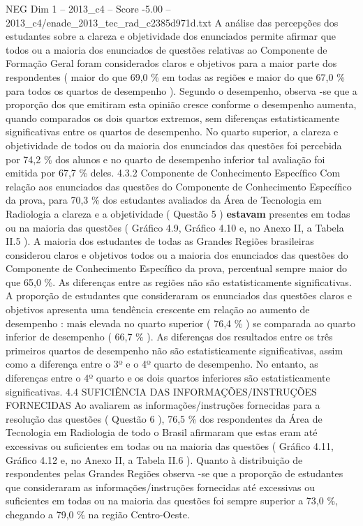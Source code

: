 \begin{textsample}{NEG Dim 1 – 2013\_c4 – Score -5.00 – 2013\_c4/enade\_2013\_tec\_rad\_c2385d971d.txt}
A análise das percepções dos estudantes sobre a clareza e objetividade dos enunciados permite afirmar que todos ou a maioria dos enunciados de questões relativas ao Componente de Formação Geral foram considerados claros e objetivos para a maior parte dos respondentes ( maior do que 69,0 \% em todas as regiões e maior do que 67,0 \% para todos os quartos de desempenho ).
Segundo o desempenho, observa -se que a proporção dos que emitiram esta opinião cresce conforme o desempenho aumenta, quando comparados os dois quartos extremos, sem diferenças estatisticamente significativas entre os quartos de desempenho.
No quarto superior, a clareza e objetividade de todos ou da maioria dos enunciados das questões foi percebida por 74,2 \% dos alunos e no quarto de desempenho inferior tal avaliação foi emitida por 67,7 \% deles. 4.3.2 Componente de Conhecimento Específico Com relação aos enunciados das questões do Componente de Conhecimento Específico da prova, para 70,3 \% dos estudantes avaliados da Área de Tecnologia em Radiologia a clareza e a objetividade ( Questão 5 ) \textbf{estavam} presentes em todas ou na maioria das questões ( Gráfico 4.9, Gráfico 4.10 e, no Anexo II, a Tabela II.5 ).
A maioria dos estudantes de todas as Grandes Regiões brasileiras considerou claros e objetivos todos ou a maioria dos enunciados das questões do Componente de Conhecimento Específico da prova, percentual sempre maior do que 65,0 \%.
As diferenças entre as regiões não são estatisticamente significativas.
A proporção de estudantes que consideraram os enunciados das questões claros e objetivos apresenta uma tendência crescente em relação ao aumento de desempenho : mais elevada no quarto superior ( 76,4 \% ) se comparada ao quarto inferior de desempenho ( 66,7 \% ).
As diferenças dos resultados entre os três primeiros quartos de desempenho não são estatisticamente significativas, assim como a diferença entre o 3º e o 4º quarto de desempenho.
No entanto, as diferenças entre o 4º quarto e os dois quartos inferiores são estatisticamente significativas. 4.4 SUFICIÊNCIA DAS INFORMAÇÕES/INSTRUÇÕES FORNECIDAS Ao avaliarem as informações/instruções fornecidas para a resolução das questões ( Questão 6 ), 76,5 \% dos respondentes da Área de Tecnologia em Radiologia de todo o Brasil afirmaram que estas eram até excessivas ou suficientes em todas ou na maioria das questões ( Gráfico 4.11, Gráfico 4.12 e, no Anexo II, a Tabela II.6 ).
Quanto à distribuição de respondentes pelas Grandes Regiões observa -se que a proporção de estudantes que consideraram as informações/instruções fornecidas até excessivas ou suficientes em todas ou na maioria das questões foi sempre superior a 73,0 \%, chegando a 79,0 \% na região Centro-Oeste.

\end{textsample}
